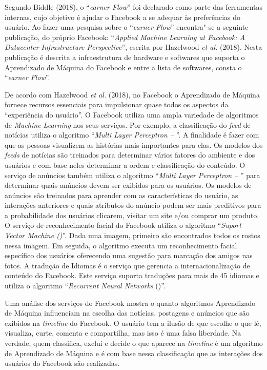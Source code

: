 Segundo Biddle (2018), o ``\emph{earner Flow}'' foi declarado como
parte das ferramentas internas, cujo objetivo é ajudar o Facebook a se
adequar às preferências do usuário. Ao fazer uma pesquisa sobre o
``\emph{earner Flow}'' encontra"-se a seguinte publicação, do próprio
Facebook: ``\emph{Applied Machine Learning at Facebook: A Datacenter
Infrastructure Perspective}'', escrita por Hazelwood \emph{et al.} (2018). Nesta
publicação é descrita a infraestrutura de hardware e softwares que
suporta o Aprendizado de Máquina do Facebook e entre a lista de
softwares, consta o ``\emph{earner Flow}''.

De acordo com Hazelwood \emph{et al.} (2018), no Facebook o Aprendizado de
Máquina fornece recursos essenciais para impulsionar quase todos os
aspectos da ``experiência do usuário''. O Facebook utiliza uma ampla
variedade de algoritmos de \emph{Machine Learning} nos seus serviços.
Por exemplo, a classificação do \emph{feed} de notícias utiliza o
algoritmo ``\emph{Multi Layer Perceptron -- }''. A finalidade é fazer
com que as pessoas visualizem as histórias mais importantes para elas.
Os modelos dos \emph{feeds} de notícias são treinados para determinar
vários fatores do ambiente e dos usuários e com base neles determinar a
ordem e classificação do conteúdo. O serviço de anúncios também utiliza
o algoritmo ``\emph{Multi Layer Perceptron -- }'' para determinar
quais anúncios devem ser exibidos para os usuários. Os modelos de
anúncios são treinados para aprender com as características do usuário,
as interações anteriores e quais atributos do anúncio podem ser mais
preditivos para a probabilidade dos usuários clicarem, visitar um site
e/ou comprar um produto. O serviço de reconhecimento facial do Facebook
utiliza o algoritmo ``\emph{Suport Vector Machine ()}''. Dada uma
imagem, primeiro são encontrados todos os rostos nessa imagem. Em
seguida, o algoritmo executa um reconhecimento facial específico dos
usuários oferecendo uma sugestão para marcação dos amigos nas fotos. A
tradução de Idiomas é o serviço que gerencia a internacionalização de
conteúdo do Facebook. Este serviço suporta traduções para mais de 45
idiomas e utiliza o algoritmo ``\emph{Recurrent Neural Networks}
()''.

Uma análise dos serviços do Facebook mostra o quanto algoritmos
Aprendizado de Máquina influenciam na escolha das notícias, postagens e
anúncios que são exibidos na \emph{timeline} do Facebook. O usuário tem
a ilusão de que escolhe o que lê, visualiza, curte, comenta e
compartilha, mas isso é uma falsa liberdade. Na verdade, quem
classifica, exclui e decide o que aparece na \emph{timeline} é um
algoritmo de Aprendizado de Máquina e é com base nessa classificação que
as interações dos usuários do Facebook são realizadas.

